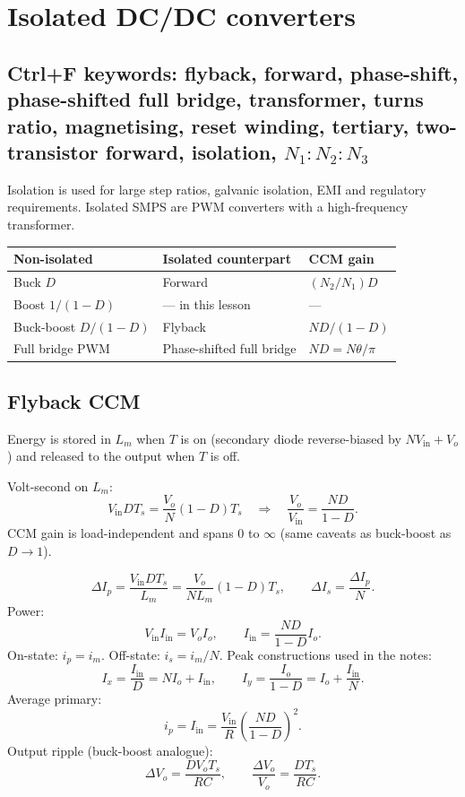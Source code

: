 \section{Isolated DC/DC converters}

\subsection{Ctrl+F keywords: flyback, forward, phase-shift, phase-shifted full bridge, transformer, turns ratio, magnetising, reset winding, tertiary, two-transistor forward, isolation, \(N_1:N_2:N_3\)}

Isolation is used for large step ratios, galvanic isolation, EMI and regulatory requirements. Isolated SMPS are PWM converters with a high-frequency transformer.

\begin{center}
\begin{tabular}{@{}lll@{}}
\toprule
Non-isolated & Isolated counterpart & CCM gain\\
\midrule
Buck \(D\) & Forward & \((N_2/N_1)D\)\\
Boost \(1/(1-D)\) & --- in this lesson & ---\\
Buck-boost \(D/(1-D)\) & Flyback & \(N D/(1-D)\)\\
Full bridge PWM & Phase-shifted full bridge & \(N D=N\theta/\pi\)\\
\bottomrule
\end{tabular}
\end{center}

\subsection{Flyback CCM}
Energy is stored in \(L_m\) when \(T\) is on (secondary diode reverse-biased by \(N V_{\mathrm{in}}+V_o\)) and released to the output when \(T\) is off.

Volt-second on \(L_m\):
\[
V_{\mathrm{in}} D T_s=\frac{V_o}{N}(1-D)T_s \quad\Rightarrow\quad \frac{V_o}{V_{\mathrm{in}}}=\frac{N D}{1-D}.
\]
CCM gain is load-independent and spans \(0\) to \(\infty\) (same caveats as buck-boost as \(D\to 1\)).

\[
\Delta I_p=\frac{V_{\mathrm{in}} D T_s}{L_m}=\frac{V_o}{N L_m}(1-D)T_s,\qquad
\Delta I_s=\frac{\Delta I_p}{N}.
\]
Power:
\[
V_{\mathrm{in}} I_{\mathrm{in}}=V_o I_o,\qquad I_{\mathrm{in}}=\frac{N D}{1-D}I_o.
\]
On-state: \(i_p=i_m\). Off-state: \(i_s=i_m/N\). Peak constructions used in the notes:
\[
I_x=\frac{I_{\mathrm{in}}}{D}=N I_o+I_{\mathrm{in}},\qquad
I_y=\frac{I_o}{1-D}=I_o+\frac{I_{\mathrm{in}}}{N}.
\]
Average primary:
\[
i_p=I_{\mathrm{in}}=\frac{V_{\mathrm{in}}}{R}\left(\frac{N D}{1-D}\right)^2.
\]
Output ripple (buck-boost analogue):
\[
\Delta V_o=\frac{D V_o T_s}{R C},\qquad \frac{\Delta V_o}{V_o}=\frac{D T_s}{R C}.
\]

